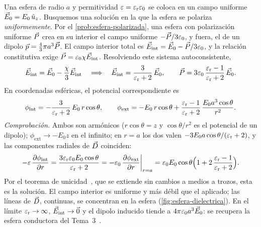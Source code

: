 \begin{ejemplo}\label{ej:esfera-dielectrica}
Una esfera de radio $a$ y permitividad $\varepsilon=\varepsilon_{\mathrm r}\varepsilon_0$ se coloca en un campo uniforme $\vec E_0=E_0\,\hat u_{z}$. Busquemos una solución en
la que la esfera se polariza \emph{uniformemente}. Por el \cref{prob:esfera-polarizada}, una esfera con polarización uniforme
$\vec P$ crea en su interior el campo uniforme $-\vec P/3\varepsilon_0$, y fuera, el de un dipolo $\vec p=\tfrac43\pi a^3\vec P$. El campo interior total es
$\vec E_{\mathrm{int}}=\vec E_0-\vec P/3\varepsilon_0$, y la relación constitutiva exige $\vec P=\varepsilon_0\chi\vec E_{\mathrm{int}}$. Resolviendo este sistema autoconsistente,
\[
  \vec E_{\mathrm{int}}=\vec E_0-\frac{\chi}{3}\vec E_{\mathrm{int}}
  \quad\Longrightarrow\quad
  \vec E_{\mathrm{int}}=\frac{3}{\varepsilon_{\mathrm r}+2}\,\vec E_0 ,\qquad
  \vec P=3\varepsilon_0\,\frac{\varepsilon_{\mathrm r}-1}{\varepsilon_{\mathrm r}+2}\,\vec E_0 .
\]
En coordenadas esféricas, el potencial correspondiente es
\[
  \phi_{\mathrm{int}}=-\frac{3}{\varepsilon_{\mathrm r}+2}\,E_0\,r\cos\theta,
  \qquad
  \phi_{\mathrm{ext}}=-E_0\,r\cos\theta+\frac{\varepsilon_{\mathrm r}-1}{\varepsilon_{\mathrm r}+2}\,\frac{E_0a^3\cos\theta}{r^2}.
\]
\emph{Comprobación.} Ambos son armónicos ($r\cos\theta=z$ y $\cos\theta/r^2$ es el potencial de un dipolo); $\phi_{\mathrm{ext}}\to-E_0z$ en el
infinito; en $r=a$ los dos valen $-3E_0a\cos\theta/(\varepsilon_{\mathrm r}+2)$, y las componentes radiales de $\vec D$ coinciden:
\[
  -\varepsilon\,\frac{\partial\phi_{\mathrm{int}}}{\partial r}=\frac{3\varepsilon_{\mathrm r}\varepsilon_0 E_0\cos\theta}{\varepsilon_{\mathrm r}+2}
  =-\varepsilon_0\,\frac{\partial\phi_{\mathrm{ext}}}{\partial r}\bigg|_{r=a}=\varepsilon_0 E_0\cos\theta\Big(1+2\,\frac{\varepsilon_{\mathrm r}-1}{\varepsilon_{\mathrm r}+2}\Big).
\]
Por el teorema de unicidad~\cite{T3,Jackson}, que se extiende sin cambios a medios \LHI{} a trozos, esta es la solución.
El campo interior es uniforme y más débil que el aplicado; las líneas de $\vec D$, continuas, se concentran en la esfera
(\cref{fig:esfera-dielectrica}). En el límite $\varepsilon_{\mathrm r}\to\infty$, $\vec E_{\mathrm{int}}\to\vec 0$ y el dipolo inducido tiende a $4\pi\varepsilon_0 a^3\vec E_0$: se
recupera la esfera conductora del Tema~3~\cite{T3}.
\end{ejemplo}


